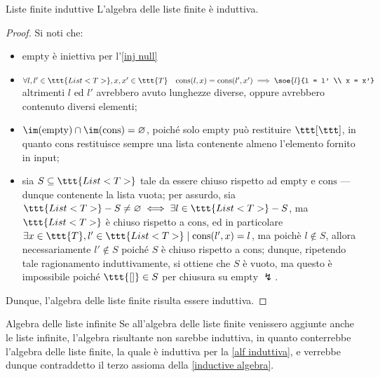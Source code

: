 \documentclass[a4paper, 12pt]{report}
\begin{document}
    \begin{framedprop}[label={alf induttiva}]{Liste finite induttive}
        L'algebra delle liste finite è induttiva.
    \end{framedprop}

    \begin{proof}
        Si noti che:

        \begin{itemize}
            \item $\mathrm{empty}$ è iniettiva per l'\cref{inj null}
            \item $\forall l, l' \in \ttt{List<T>}, x, x' \in \ttt{T} \quad \mathrm{cons}(l, x) = \mathrm{cons}(l', x') \implies \soe{l}{l = l' \\ x = x'}$ altrimenti $l$ ed $l'$ avrebbero avuto lunghezze diverse, oppure avrebbero contenuto diversi elementi;
            \item $\im(\mathrm{empty}) \cap \im(\mathrm{cons}) = \varnothing$, poiché solo $\mathrm{empty}$ può restituire $\ttt [ \ttt ]$, in quanto $\mathrm{cons}$ restituisce sempre una lista contenente almeno l'elemento fornito in input;
            \item sia $S \subseteq \ttt{List<T>}$ tale da essere chiuso rispetto ad $\mathrm{empty}$ e $\mathrm{cons}$ --- dunque contenente la lista vuota; per assurdo, sia $\ttt{List<T>} - S \neq \varnothing \iff \exists l \in \ttt{List<T>} - S$, ma $\ttt{List<T>}$ è chiuso rispetto a $\mathrm{cons}$, ed in particolare $\exists x \in \ttt{T}, l' \in \ttt{List<T>} \mid \mathrm{cons}(l', x) = l$, ma poichè $l \notin S$, allora necessariamente $l' \notin S$ poiché $S$ è chiuso rispetto a $\mathrm{cons}$; dunque, ripetendo tale ragionamento induttivamente, si ottiene che $S$ è vuoto, ma questo è impossibile poiché $\ttt{[]} \in S$ per chiusura su $\mathrm{empty}$ $\lightning$.
        \end{itemize}

        Dunque, l'algebra delle liste finite risulta essere induttiva.
    \end{proof}

    \begin{framedobs}[label={infinite lists}]{Algebra delle liste infinite}
        Se all'algebra delle liste finite venissero aggiunte anche le liste infinite, l'algebra risultante non sarebbe induttiva, in quanto conterrebbe l'algebra delle liste finite, la quale è induttiva per la \cref{alf induttiva}, e verrebbe dunque contraddetto il terzo assioma della \cref{inductive algebra}.
    \end{framedobs}
\end{document}
